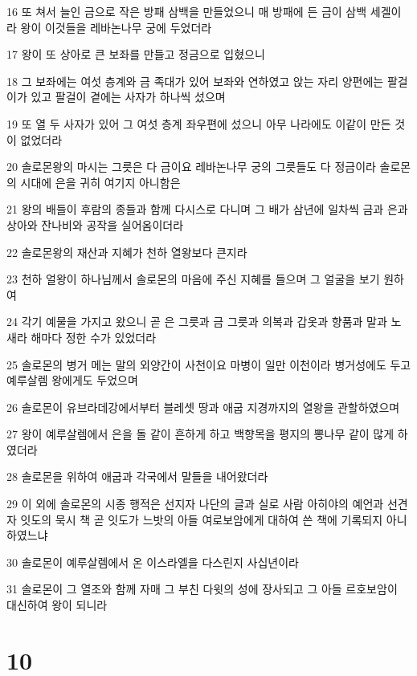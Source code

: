\par 16 또 쳐서 늘인 금으로 작은 방패 삼백을 만들었으니 매 방패에 든 금이 삼백 세겔이라 왕이 이것들을 레바논나무 궁에 두었더라
\par 17 왕이 또 상아로 큰 보좌를 만들고 정금으로 입혔으니
\par 18 그 보좌에는 여섯 층계와 금 족대가 있어 보좌와 연하였고 앉는 자리 양편에는 팔걸이가 있고 팔걸이 곁에는 사자가 하나씩 섰으며
\par 19 또 열 두 사자가 있어 그 여섯 층계 좌우편에 섰으니 아무 나라에도 이같이 만든 것이 없었더라
\par 20 솔로몬왕의 마시는 그릇은 다 금이요 레바논나무 궁의 그릇들도 다 정금이라 솔로몬의 시대에 은을 귀히 여기지 아니함은
\par 21 왕의 배들이 후람의 종들과 함께 다시스로 다니며 그 배가 삼년에 일차씩 금과 은과 상아와 잔나비와 공작을 실어옴이더라
\par 22 솔로몬왕의 재산과 지혜가 천하 열왕보다 큰지라
\par 23 천하 얼왕이 하나님께서 솔로몬의 마음에 주신 지혜를 들으며 그 얼굴을 보기 원하여
\par 24 각기 예물을 가지고 왔으니 곧 은 그릇과 금 그릇과 의복과 갑옷과 향품과 말과 노새라 해마다 정한 수가 있었더라
\par 25 솔로몬의 병거 메는 말의 외양간이 사천이요 마병이 일만 이천이라 병거성에도 두고 예루살렘 왕에게도 두었으며
\par 26 솔로몬이 유브라데강에서부터 블레셋 땅과 애굽 지경까지의 열왕을 관할하였으며
\par 27 왕이 예루살렘에서 은을 돌 같이 흔하게 하고 백향목을 평지의 뽕나무 같이 많게 하였더라
\par 28 솔로몬을 위하여 애굽과 각국에서 말들을 내어왔더라
\par 29 이 외에 솔로몬의 시종 행적은 선지자 나단의 글과 실로 사람 아히야의 예언과 선견자 잇도의 묵시 책 곧 잇도가 느밧의 아들 여로보암에게 대하여 쓴 책에 기록되지 아니하였느냐
\par 30 솔로몬이 예루살렘에서 온 이스라엘을 다스린지 사십년이라
\par 31 솔로몬이 그 열조와 함께 자매 그 부친 다윗의 성에 장사되고 그 아들 르호보암이 대신하여 왕이 되니라

\chapter{10}

